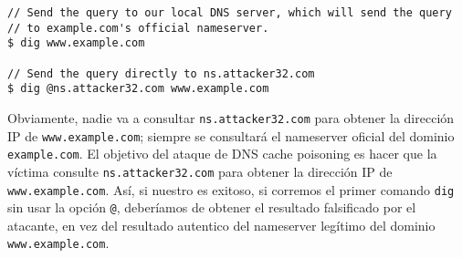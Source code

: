 \begin{lstlisting}
// Send the query to our local DNS server, which will send the query
// to example.com's official nameserver. 
$ dig www.example.com

// Send the query directly to ns.attacker32.com 
$ dig @ns.attacker32.com www.example.com
\end{lstlisting}
 
Obviamente, nadie va a consultar \texttt{ns.attacker32.com} para obtener la dirección IP de \texttt{www.example.com}; siempre se consultará el nameserver oficial del dominio \texttt{example.com}. El objetivo del ataque de DNS cache poisoning es hacer que la víctima consulte \texttt{ns.attacker32.com} para obtener la dirección IP de \texttt{www.example.com}. Así, si nuestro es exitoso, si corremos el primer comando  \texttt{dig} sin usar la opción \texttt{@}, deberíamos de obtener el resultado falsificado por el atacante, en vez del resultado autentico del nameserver legítimo del dominio  \texttt{www.example.com}.


